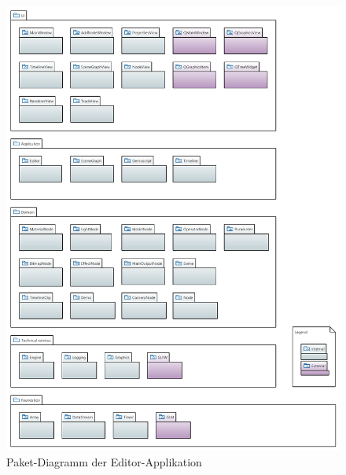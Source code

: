 \begin{figure}[H]
    \centering
    \includegraphics[width=1.0\textwidth]{img/editor_package_diagram.png}
    \caption{Paket-Diagramm der Editor-Applikation}\label{fig:package-diagram:editor}
\end{figure}
